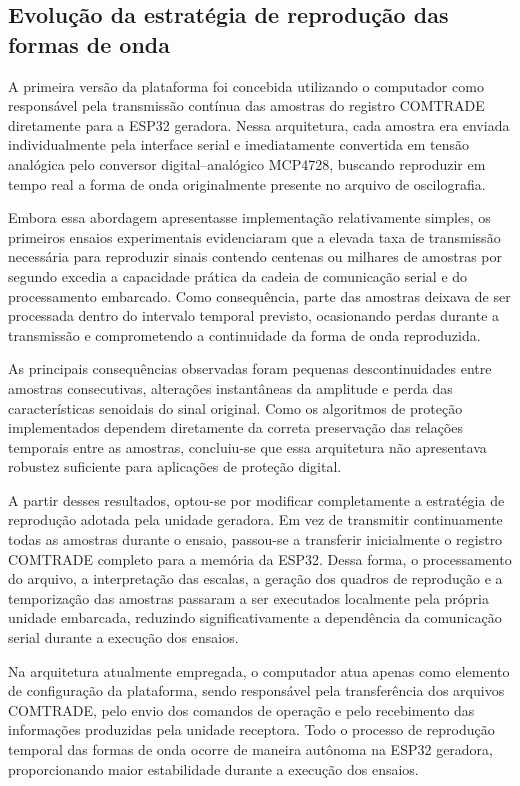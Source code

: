 \subsection{Evolução da estratégia de reprodução das formas de onda}

A primeira versão da plataforma foi concebida utilizando o computador como responsável pela transmissão contínua das amostras do registro COMTRADE diretamente para a ESP32 geradora. Nessa arquitetura, cada amostra era enviada individualmente pela interface serial e imediatamente convertida em tensão analógica pelo conversor digital--analógico MCP4728, buscando reproduzir em tempo real a forma de onda originalmente presente no arquivo de oscilografia.

Embora essa abordagem apresentasse implementação relativamente simples, os primeiros ensaios experimentais evidenciaram que a elevada taxa de transmissão necessária para reproduzir sinais contendo centenas ou milhares de amostras por segundo excedia a capacidade prática da cadeia de comunicação serial e do processamento embarcado. Como consequência, parte das amostras deixava de ser processada dentro do intervalo temporal previsto, ocasionando perdas durante a transmissão e comprometendo a continuidade da forma de onda reproduzida.

As principais consequências observadas foram pequenas descontinuidades entre amostras consecutivas, alterações instantâneas da amplitude e perda das características senoidais do sinal original. Como os algoritmos de proteção implementados dependem diretamente da correta preservação das relações temporais entre as amostras, concluiu-se que essa arquitetura não apresentava robustez suficiente para aplicações de proteção digital.

A partir desses resultados, optou-se por modificar completamente a estratégia de reprodução adotada pela unidade geradora. Em vez de transmitir continuamente todas as amostras durante o ensaio, passou-se a transferir inicialmente o registro COMTRADE completo para a memória da ESP32. Dessa forma, o processamento do arquivo, a interpretação das escalas, a geração dos quadros de reprodução e a temporização das amostras passaram a ser executados localmente pela própria unidade embarcada, reduzindo significativamente a dependência da comunicação serial durante a execução dos ensaios.

Na arquitetura atualmente empregada, o computador atua apenas como elemento de configuração da plataforma, sendo responsável pela transferência dos arquivos COMTRADE, pelo envio dos comandos de operação e pelo recebimento das informações produzidas pela unidade receptora. Todo o processo de reprodução temporal das formas de onda ocorre de maneira autônoma na ESP32 geradora, proporcionando maior estabilidade durante a execução dos ensaios.

